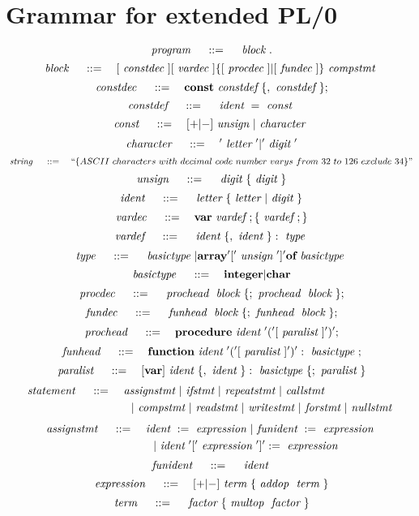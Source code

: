 \section{Grammar for extended PL/0}
\label{sec:gfepl0}

\[
	~\emph{program}~ \quad ::= \quad 
		~\emph{block}~.
\]
\[
	~\emph{block}~ \quad ::= \quad 
		[~\emph{constdec}~] [~\emph{vardec}~] \{[~\emph{procdec}~] | [~\emph{fundec}~]\} ~\emph{compstmt}~
\]
\[
	~\emph{constdec}~ \quad ::= \quad
		\textbf{const} ~\emph{constdef}~ \{,~\emph{constdef}~\};	
\]
\[
	~\emph{constdef}~ \quad ::= \quad
		~\emph{ident}~ = ~\emph{const}~
\]
\[
	~\emph{const}~ \quad ::= \quad
		[+|-]~\emph{unsign}~|~\emph{character}~
\]
\[
	~\emph{character}~ \quad ::= \quad
		'~\emph{letter}~' | '~\emph{digit}~'
\]
\[
	~\emph{string}~ \quad ::= \quad
		``\{ASCII~characters~with~decimal~code~number~varys~from~32~to~126~exclude~34\}"
\]
\[
	~\emph{unsign}~ \quad ::= \quad
		~\emph{digit}~ \{~\emph{digit}~\}
\]
\[
	~\emph{ident}~ \quad ::= \quad
		~\emph{letter}~ \{ ~\emph{letter}~ | ~\emph{digit}~ \}
\]
\[
	~\emph{vardec}~ \quad ::= \quad
		\textbf{var} ~\emph{vardef}~; \{ ~\emph{vardef}~; \}
\]
\[
	~\emph{vardef}~ \quad ::= \quad
		~\emph{ident}~\{,~\emph{ident}~\}:~\emph{type}~
\]
\[
	~\emph{type}~ \quad ::= \quad
		~\emph{basictype}~ | \textbf{array} '['~\emph{unsign}~']' \textbf{of} ~\emph{basictype}~
\]
\[
	~\emph{basictype}~ \quad ::= \quad
		\textbf{integer} | \textbf{char}
\]
\[
	~\emph{procdec}~ \quad ::= \quad
		~\emph{prochead}~ ~\emph{block}~ \{; ~\emph{prochead}~ ~\emph{block}~ \};
\]
\[
	~\emph{fundec}~ \quad ::= \quad
		~\emph{funhead}~ ~\emph{block}~ \{; ~\emph{funhead}~ ~\emph{block}~ \};
\]
\[
	~\emph{prochead}~ \quad ::= \quad
		\textbf{procedure} ~\emph{ident}~ '(' [~\emph{paralist}~] ')';
\]
\[
	~\emph{funhead}~ \quad ::= \quad
		\textbf{function} ~\emph{ident}~ '(' [~\emph{paralist}~] ')': ~\emph{basictype}~;
\]
\[
	~\emph{paralist}~ \quad ::= \quad
		[ \textbf{var} ] ~\emph{ident}~ \{, ~\emph{ident}~ \}: ~\emph{basictype}~ \{; ~\emph{paralist}~ \}
\]
\[ \begin{aligned}
	~\emph{statement}~ \quad ::= \quad
		& ~\emph{assignstmt}~ | ~\emph{ifstmt}~ | ~\emph{repeatstmt}~ | ~\emph{callstmt}~ \\
		& \quad | ~\emph{compstmt}~ | ~\emph{readstmt}~ | ~\emph{writestmt}~ | ~\emph{forstmt}~ | ~\emph{nullstmt}~
\end{aligned} \]
\[ \begin{aligned}
	~\emph{assignstmt}~ \quad ::= \quad
		& ~\emph{ident}~ := ~\emph{expression}~ | ~\emph{funident}~ := ~\emph{expression}~  \\
		& \quad | ~\emph{ident}~ '[' ~\emph{expression}~ ']' := ~\emph{expression}~
\end{aligned} \]
\[
	~\emph{funident}~ \quad ::= \quad
		~\emph{ident}~
\]
\[
	~\emph{expression}~ \quad ::= \quad
		[+|-] ~\emph{term}~ \{ ~\emph{addop}~ ~\emph{term}~ \}
\]
\[
	~\emph{term}~ \quad ::= \quad
		~\emph{factor}~ \{ ~\emph{multop}~ ~\emph{factor}~ \}
\]
